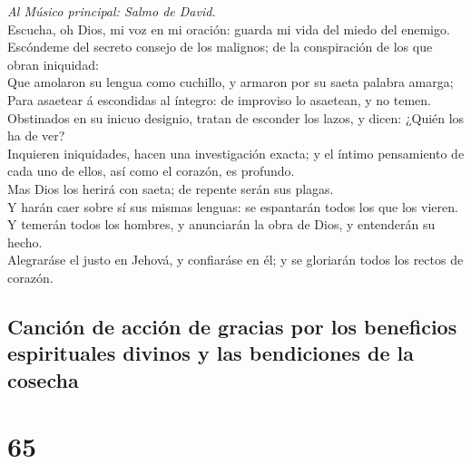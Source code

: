  \emph{Al Músico principal: Salmo de David.}\\
Escucha, oh Dios, mi voz en mi oración: guarda mi vida del miedo del
enemigo.\\
 Escóndeme del secreto consejo de los malignos; de la
conspiración de los que obran iniquidad:\\
 Que amolaron su lengua como cuchillo, y armaron por su
saeta palabra amarga;\\
 Para asaetear á escondidas al íntegro: de improviso lo
asaetean, y no temen.\\
 Obstinados en su inicuo designio, tratan de esconder los
lazos, y dicen: ¿Quién los ha de ver?\\
 Inquieren iniquidades, hacen una investigación exacta; y el
íntimo pensamiento de cada uno de ellos, así como el corazón, es
profundo.\\
 Mas Dios los herirá con saeta; de repente serán sus
plagas.\\
 Y harán caer sobre sí sus mismas lenguas: se espantarán
todos los que los vieren.\\
 Y temerán todos los hombres, y anunciarán la obra de Dios,
y entenderán su hecho.\\
 Alegraráse el justo en Jehová, y confiaráse en él; y se
gloriarán todos los rectos de corazón.

\hypertarget{canciuxf3n-de-acciuxf3n-de-gracias-por-los-beneficios-espirituales-divinos-y-las-bendiciones-de-la-cosecha}{%
\subsection{Canción de acción de gracias por los beneficios espirituales
divinos y las bendiciones de la
cosecha}\label{canciuxf3n-de-acciuxf3n-de-gracias-por-los-beneficios-espirituales-divinos-y-las-bendiciones-de-la-cosecha}}

\hypertarget{section-64}{%
\section{65}\label{section-64}}

